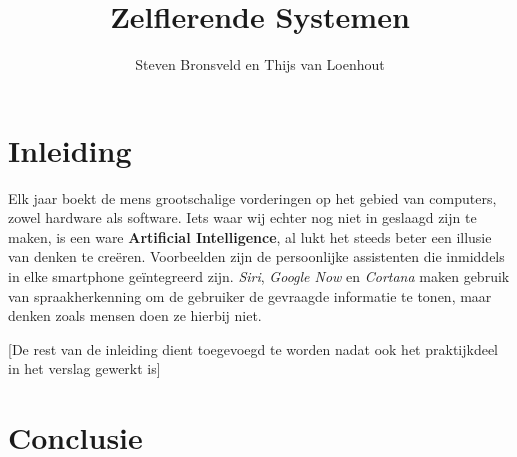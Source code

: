 \documentclass[a4paper,titlepage]{article}
\title{Zelflerende Systemen}
\author{Steven Bronsveld en Thijs van Loenhout}
\begin{document}
\begin{titlepage}

\maketitle
\end{titlepage}

\renewcommand{\contentsname}{Inhoud}

\newpage
\tableofcontents

\newpage
\section{Inleiding}
Elk jaar boekt de mens grootschalige vorderingen op het gebied van computers, zowel hardware als software. Iets waar wij echter nog niet in geslaagd zijn te maken, is een ware \textbf{ Artificial Intelligence}, al lukt het steeds beter een illusie van denken te cre\"eren. Voorbeelden zijn de persoonlijke assistenten die inmiddels in elke smartphone geïntegreerd zijn. \textit{Siri}, \textit{Google Now} en \textit{Cortana} maken gebruik van spraakherkenning om de gebruiker de gevraagde informatie te tonen, maar denken zoals mensen doen ze hierbij niet.

[De rest van de inleiding dient toegevoegd te worden nadat ook het praktijkdeel in het verslag gewerkt is]


\newpage


\newpage


\newpage


\newpage


\newpage


\newpage


\newpage
\section{Conclusie}

\newpage
\printbibheading[title={Bronnen},heading=bibnumbered]
\printbibliography[keyword=Deelvraag1,heading=subbibnumbered,title={Deelvraag 1}]
\printbibliography[keyword=Deelvraag2,heading=subbibnumbered,title={Deelvraag 2}]
\printbibliography[keyword=Deelvraag3,heading=subbibnumbered,title={Deelvraag 3}]
\printbibliography[keyword=Deelvraag4,heading=subbibnumbered,title={Deelvraag 4}]
\printbibliography[keyword=Deelvraag5,heading=subbibnumbered,title={Deelvraag 5}]
\printbibliography[keyword=Deelvraag6,heading=subbibnumbered,title={Deelvraag 6}]
\end{document}
